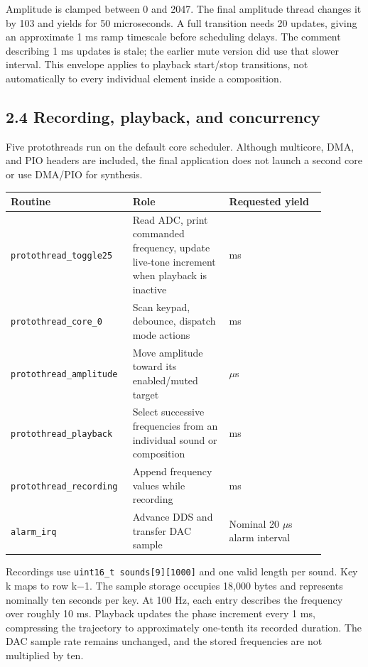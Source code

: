 \documentclass[11pt,letterpaper]{article}
\begin{document}
Amplitude is clamped between 0 and 2047. The final amplitude thread changes it by 103 and yields for 50 microseconds. A full transition needs 20 updates, giving an approximate 1 ms ramp timescale before scheduling delays. The comment describing 1 ms updates is stale; the earlier mute version did use that slower interval. This envelope applies to playback start/stop transitions, not automatically to every individual element inside a composition.

\subsection*{2.4 Recording, playback, and concurrency}

Five protothreads run on the default core scheduler. Although multicore, DMA, and PIO headers are included, the final application does not launch a second core or use DMA/PIO for synthesis.

\begingroup\small
\setlength{\tabcolsep}{5pt}
\begin{longtable}{|>{\raggedright\arraybackslash}p{0.295\linewidth}|>{\raggedright\arraybackslash}p{0.295\linewidth}|>{\raggedright\arraybackslash}p{0.295\linewidth}|}
\hline
\textbf{Routine} & \textbf{Role} & \textbf{Requested yield} \\ \hline
\endhead
\texttt{protothread\_toggle25} & Read ADC, print commanded frequency, update live-tone increment when playback is inactive & 10 ms \\ \hline
\texttt{protothread\_core\_0} & Scan keypad, debounce, dispatch mode actions & 30 ms \\ \hline
\texttt{protothread\_amplitude} & Move amplitude toward its enabled/muted target & 50 \ensuremath{\mu}s \\ \hline
\texttt{protothread\_playback} & Select successive frequencies from an individual sound or composition & 1 ms \\ \hline
\texttt{protothread\_recording} & Append frequency values while recording & 10 ms \\ \hline
\texttt{alarm\_irq} & Advance DDS and transfer DAC sample & Nominal 20 \ensuremath{\mu}s alarm interval \\ \hline
\end{longtable}
\endgroup

Recordings use \texttt{uint16\_t sounds[9][1000]} and one valid length per sound. Key k maps to row k\ensuremath{-}1. The sample storage occupies 18,000 bytes and represents nominally ten seconds per key. At 100 Hz, each entry describes the frequency over roughly 10 ms. Playback updates the phase increment every 1 ms, compressing the trajectory to approximately one-tenth its recorded duration. The DAC sample rate remains unchanged, and the stored frequencies are not multiplied by ten.
\end{document}
